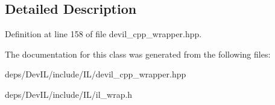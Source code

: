 \subsection{Detailed Description}


Definition at line 158 of file devil\+\_\+cpp\+\_\+wrapper.\+hpp.



The documentation for this class was generated from the following files\+:\begin{DoxyCompactItemize}
\item 
deps/\+Dev\+I\+L/include/\+I\+L/devil\+\_\+cpp\+\_\+wrapper.\+hpp\item 
deps/\+Dev\+I\+L/include/\+I\+L/il\+\_\+wrap.\+h\end{DoxyCompactItemize}
